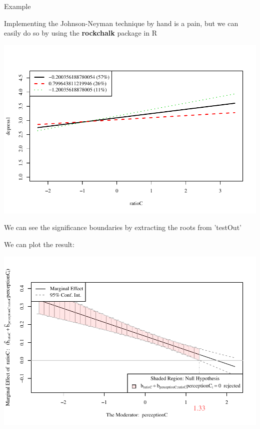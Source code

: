 \documentclass{beamer}
\newcommand{\va}[0]{\vspace{12pt}}
\begin{document}
  
\begin{frame}[allowframebreaks]{Example}
  
  Implementing the Johnson-Neyman technique by hand is a pain, but we
  can easily do so by using the \textbf{rockchalk} package in
  \textsf{R}\\ 
  \va
  

\includegraphics{sweaveFiles/-014}
\pagebreak

We can see the significance boundaries by extracting the roots from
'testOut'

\va
We can plot the result:

\includegraphics{sweaveFiles/-016}

\end{frame}
\end{document}
